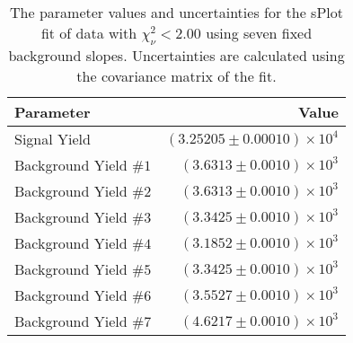 
\begin{table}[ht]
    \begin{center}
        \begin{tabular}{lr}\toprule
            Parameter & Value \\\midrule
            Signal Yield & $(3.25205 \pm 0.00010) \times 10^{4}$ \\
            Background Yield $\#1$ & $(3.6313 \pm 0.0010) \times 10^{3}$ \\
            Background Yield $\#2$ & $(3.6313 \pm 0.0010) \times 10^{3}$ \\
            Background Yield $\#3$ & $(3.3425 \pm 0.0010) \times 10^{3}$ \\
            Background Yield $\#4$ & $(3.1852 \pm 0.0010) \times 10^{3}$ \\
            Background Yield $\#5$ & $(3.3425 \pm 0.0010) \times 10^{3}$ \\
            Background Yield $\#6$ & $(3.5527 \pm 0.0010) \times 10^{3}$ \\
            Background Yield $\#7$ & $(4.6217 \pm 0.0010) \times 10^{3}$ \\\bottomrule
        \end{tabular}
        \caption{The parameter values and uncertainties for the sPlot fit of data with $\chi^2_\nu < 2.00$ using seven fixed background slopes. Uncertainties are calculated using the covariance matrix of the fit.}\label{tab:splot-fit-results-chisqdof-2.00-fixed-7}
    \end{center}
\end{table}
